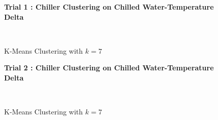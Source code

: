 \begin{figure}[!h]
\centerline{\bfseries\Large Trial 1 : Chiller Clustering on Chilled Water-Temperature Delta}\\
\caption{K-Means Clustering with $k=7$}
\end{figure}
\begin{figure}[!h]
\centerline{\bfseries\Large Trial 2 : Chiller Clustering on Chilled Water-Temperature Delta}\\
\caption{K-Means Clustering with $k=7$}
\end{figure}
